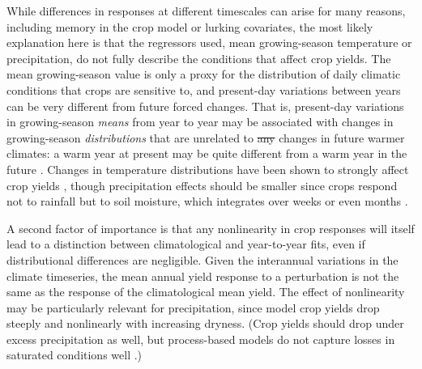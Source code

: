 \documentclass[gmdd]{copernicus} %
\providecommand{\DIFadd}[1]{{\protect\color{blue}\uwave{#1}}} %
\providecommand{\DIFdel}[1]{{\protect\color{red}\sout{#1}}}                      %
\providecommand{\DIFaddbegin}{} %
\providecommand{\DIFaddend}{} %
\providecommand{\DIFdelbegin}{} %
\providecommand{\DIFdelend}{} %
\begin{document}
While differences in responses at different timescales can arise for many reasons, including memory in the crop model or lurking covariates, the most likely explanation here is that the regressors used, mean growing-season temperature or precipitation, do not fully describe the conditions that affect crop yields. 
The mean growing-season value is only a proxy for the distribution of daily climatic conditions that crops are sensitive to, and present-day variations between years can be very different from future forced changes. 
That is, present-day variations in growing-season \textit{means} from year to year may be associated with changes in growing-season \textit{distributions} that are unrelated to \DIFdelbegin \DIFdel{any }\DIFdelend changes in future warmer climates: \DIFaddbegin \DIFadd{that is, }\DIFaddend a warm year at present may be quite different from a warm year in the future \citep[e.g.][]{Ruane2016}.
Changes in temperature distributions have been shown to strongly affect crop yields \citep[e.g.][]{Hansen2000, Gadgil2002}, though precipitation effects should be smaller since crops respond not to rainfall but to soil moisture, which integrates over weeks or even months \citep[e.g.][]{potter2005effects, Glotter14, CHALLINOR200499}. 

A second factor of importance is that any nonlinearity in crop responses will itself lead to a distinction between climatological and year-to-year fits, even if distributional differences are negligible. 
Given the interannual variations in the climate timeseries, the mean annual yield response to a perturbation is not the same as the response of the climatological mean yield. 
The effect of nonlinearity may be particularly relevant for precipitation, since model crop yields drop steeply and nonlinearly with increasing dryness. 
(Crop yields should drop under excess precipitation as well, but process-based models do not capture losses in saturated conditions well \citep{Glotter15,Li2019}.) 
\end{document}
